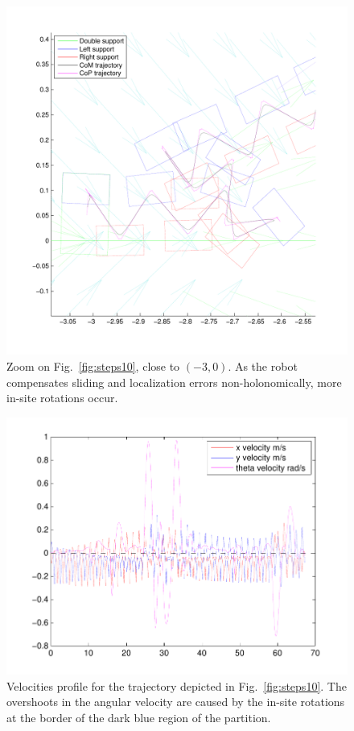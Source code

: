 \begin{figure}[ht]
\centering
\includegraphics[scale=0.55]{Chap5-Visual-Planning/steps10zoom.pdf}
\caption{Zoom on Fig.~\ref{fig:steps10}, close to $(-3,0)$. As the robot compensates sliding and localization errors non-holonomically, more in-site rotations occur.}
\label{fig:steps10zoom}
\end{figure}

\begin{figure}[ht]
\centering
\includegraphics[scale=0.7  ]{Chap5-Visual-Planning/velocities10.pdf}
\caption{Velocities profile for the trajectory depicted in Fig.~\ref{fig:steps10}. The overshoots in the angular velocity are caused by the in-site rotations at the border of the dark blue region of the partition.}
\label{fig:velocities10}
\end{figure}


